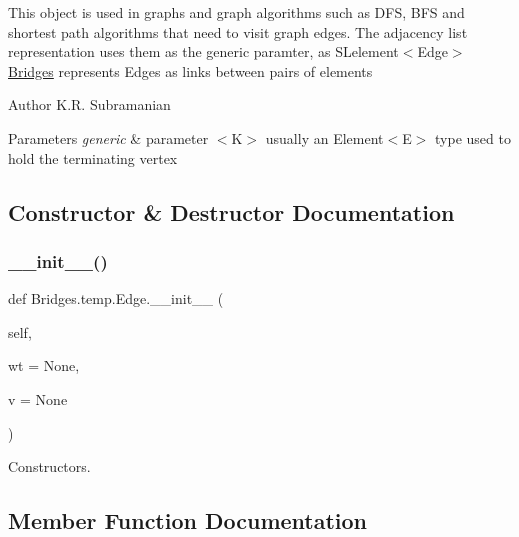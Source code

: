 This object is used in graphs and graph algorithms such as D\+FS, B\+FS and shortest path algorithms that need to visit graph edges. The adjacency list representation uses them as the generic paramter, as S\+Lelement$<$\+Edge$>$ \mbox{\hyperlink{namespace_bridges_1_1_bridges}{Bridges}} represents Edges as links between pairs of elements

\begin{DoxyAuthor}{Author}
K.\+R. Subramanian
\end{DoxyAuthor}

\begin{DoxyParams}{Parameters}
{\em generic} & parameter $<$\+K$>$ usually an Element$<$\+E$>$ type used to hold the terminating vertex \\
\hline
\end{DoxyParams}


\subsection{Constructor \& Destructor Documentation}
\mbox{\label{class_bridges_1_1temp_1_1_edge_a04dbca99e0561c248750fc3e7bf4121a}} 
\subsubsection{\texorpdfstring{\+\_\+\+\_\+init\+\_\+\+\_\+()}{\_\_init\_\_()}}
{\footnotesize\ttfamily def Bridges.\+temp.\+Edge.\+\_\+\+\_\+init\+\_\+\+\_\+ (\begin{DoxyParamCaption}\item[{}]{self,  }\item[{}]{wt = {\ttfamily None},  }\item[{}]{v = {\ttfamily None} }\end{DoxyParamCaption})}



Constructors. 



\subsection{Member Function Documentation}
\mbox{\label{class_bridges_1_1temp_1_1_edge_a1d0153f17363a50aad3d9e28c9d23ad9}} 
